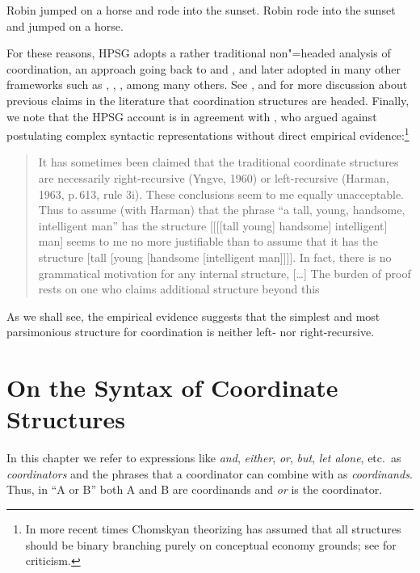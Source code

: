 {\begin{exe}
\ex
\begin{xlista}
\ex Robin jumped on a horse and rode into the sunset.
\ex Robin rode into the sunset and jumped on a horse.
\end{xlista}
\end{exe}

For these reasons, HPSG adopts a rather traditional non"=headed analysis of coordination, an approach  going back
to \citet[195]{bloom} and  \citet{ross67}, and later adopted in many other frameworks such as \citet{pesetsky}, \citet{gazdarc},  \citet[1275]{rodney}, among many others. 
See \citet{borsley94}, 
\citet{Borsley2005a} %
and 
\citet[Chaves 2]{chavesthesis} for more discussion about previous claims in the literature that coordination structures are headed.
Finally, we note that the HPSG account is in agreement with \citet[196]{chom65}, who argued against postulating complex syntactic representations without direct empirical evidence:\footnote{In more recent times Chomskyan theorizing has assumed that all structures should be binary branching purely on conceptual economy grounds; see \citet{Johnson:Lappin:99} for criticism.}

\begin{quote}
It has sometimes been claimed that the traditional coordinate structures are necessarily right-recursive (Yngve, 1960) or left-recursive (Harman, 1963, p.\,613, rule 3i). These conclusions seem to me equally unacceptable. Thus to assume (with Harman) that the phrase “a tall, young, handsome, intelligent man” has the structure [[[[tall young] handsome] intelligent] man] seems to me no more justifiable than to assume that it has
the structure [tall [young [handsome [intelligent man]]]]. In fact, there is no grammatical
motivation for any internal structure, [\ldots] The burden of proof rests on one who claims additional
structure beyond this \citep[196--197]{chom65}
\end{quote}

\noindent
As we shall see, the empirical evidence suggests that
the simplest and most parsimonious structure for coordination is neither left- nor right-recursive.


\section{On the Syntax of Coordinate Structures}

In this chapter we refer to expressions like \emph{and}, \emph{either},  \emph{or}, \emph{but}, 
\emph{let alone}, etc.\ as \emph{coordinators} and the phrases that a coordinator can combine with as  \emph{coordinands}.
Thus,  in ``A or B'' both A and B are coordinands and \emph{or} is the coordinator. 

}
